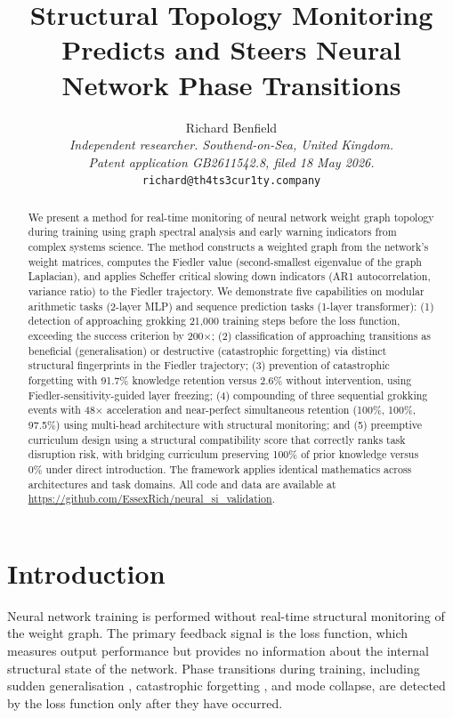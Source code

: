 \documentclass[10pt,twocolumn]{article}
\title{\textbf{Structural Topology Monitoring Predicts and Steers Neural Network Phase Transitions}}
\author{
  Richard Benfield \\
  \textit{Independent researcher. Southend-on-Sea, United Kingdom.} \\
  \textit{Patent application GB2611542.8, filed 18 May 2026.} \\
  \texttt{richard@th4ts3cur1ty.company}
}
\date{}
\begin{document}
\maketitle

\begin{abstract}
We present a method for real-time monitoring of neural network weight graph topology during training using graph spectral analysis and early warning indicators from complex systems science. The method constructs a weighted graph from the network's weight matrices, computes the Fiedler value (second-smallest eigenvalue of the graph Laplacian), and applies Scheffer critical slowing down indicators (AR1 autocorrelation, variance ratio) to the Fiedler trajectory. We demonstrate five capabilities on modular arithmetic tasks (2-layer MLP) and sequence prediction tasks (1-layer transformer): (1) detection of approaching grokking 21,000 training steps before the loss function, exceeding the success criterion by 200$\times$; (2) classification of approaching transitions as beneficial (generalisation) or destructive (catastrophic forgetting) via distinct structural fingerprints in the Fiedler trajectory; (3) prevention of catastrophic forgetting with 91.7\% knowledge retention versus 2.6\% without intervention, using Fiedler-sensitivity-guided layer freezing; (4) compounding of three sequential grokking events with 48$\times$ acceleration and near-perfect simultaneous retention (100\%, 100\%, 97.5\%) using multi-head architecture with structural monitoring; and (5) preemptive curriculum design using a structural compatibility score that correctly ranks task disruption risk, with bridging curriculum preserving 100\% of prior knowledge versus 0\% under direct introduction. The framework applies identical mathematics across architectures and task domains. All code and data are available at \url{https://github.com/EssexRich/neural_si_validation}.
\end{abstract}

\section{Introduction}

Neural network training is performed without real-time structural monitoring of the weight graph. The primary feedback signal is the loss function, which measures output performance but provides no information about the internal structural state of the network. Phase transitions during training, including sudden generalisation \citep[grokking;][]{power2022grokking}, catastrophic forgetting \citep{mccloskey1989catastrophic,french1999catastrophic}, and mode collapse, are detected by the loss function only after they have occurred.
\end{document}
